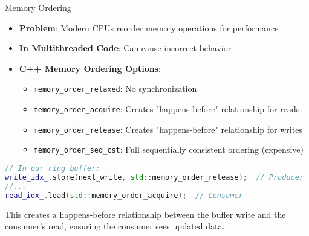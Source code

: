 \documentclass{beamer}
\begin{document}
\begin{frame}[fragile]{Memory Ordering}
\begin{itemize}
    \item \textbf{Problem}: Modern CPUs reorder memory operations for performance
    \item \textbf{In Multithreaded Code}: Can cause incorrect behavior
    \item \textbf{C++ Memory Ordering Options}:
    \begin{itemize}
        \item \texttt{memory\_order\_relaxed}: No synchronization
        \item \texttt{memory\_order\_acquire}: Creates "happens-before" relationship for reads
        \item \texttt{memory\_order\_release}: Creates "happens-before" relationship for writes
        \item \texttt{memory\_order\_seq\_cst}: Full sequentially consistent ordering (expensive)
    \end{itemize}
\end{itemize}

\begin{lstlisting}[language=C++]
// In our ring buffer:
write_idx_.store(next_write, std::memory_order_release);  // Producer
//...
read_idx_.load(std::memory_order_acquire);  // Consumer
\end{lstlisting}

This creates a happens-before relationship between the buffer write and the consumer's read, ensuring the consumer sees updated data.
\end{frame}
\end{document}
